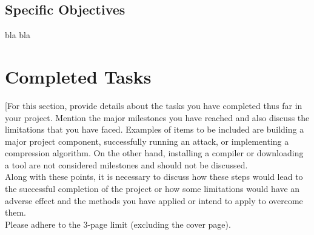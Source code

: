 \documentclass[10pt]{article}
\begin{document}
\subsection{Specific Objectives}
bla bla 

\section{Completed Tasks}

[For this section, provide details about the tasks you have completed thus far in your project. Mention the major milestones you have reached and also discuss the limitations that you have faced. Examples of items to be included are building a major project component, successfully running an attack, or implementing a compression algorithm. On the other hand, installing a compiler or downloading a tool are not considered milestones and should not be discussed. \\

Along with these points, it is necessary to discuss how these steps would lead to the successful completion of the project or how some limitations would have an adverse effect and the methods you have applied or intend to apply to overcome them. \\

Please adhere to the 3-page limit (excluding the cover page).


 
 
\end{document}
